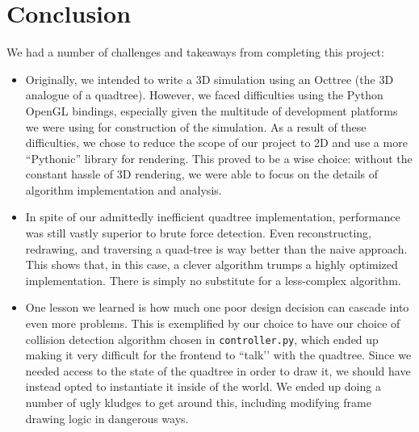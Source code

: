     \section{Conclusion}
	We had a number of challenges and takeaways from completing this
	project:
	\begin{itemize}
	  \item Originally, we intended to write a 3D simulation using
	    an Octtree (the 3D analogue of a quadtree). However, we
	    faced difficulties using the Python OpenGL bindings,
	    especially given the multitude of development platforms we
	    were using for construction of the simulation. As a result
	    of these difficulties, we chose to reduce the scope of our
	    project to 2D and use a more ``Pythonic'' library for
	    rendering. This proved to be a wise choice: without the
	    constant hassle of 3D rendering, we were able to focus on
	    the details of algorithm implementation and analysis.
	  \item In spite of our admittedly inefficient
	    quadtree implementation, performance was still vastly
	    superior to brute force detection.  Even reconstructing,
	    redrawing, and traversing a quad-tree is way better than the
	    naive approach. This shows that, in this case, a clever
	    algorithm trumps a highly optimized implementation. There is
	    simply no substitute for a less-complex algorithm.
	  \item One lesson we learned is how much one poor design
	    decision can cascade into even more problems. This is
	    exemplified by our choice to have our choice of collision
	    detection algorithm chosen in \texttt{controller.py}, which
	    ended up making it very difficult for the frontend to
	    ``talk’’ with the quadtree. Since we needed access to the
	    state of the quadtree in order to draw it, we should have
	    instead opted to instantiate it inside of the world. We
	    ended up doing a number of ugly kludges to get around this,
	    including modifying frame drawing logic in dangerous ways.
	\end{itemize}






